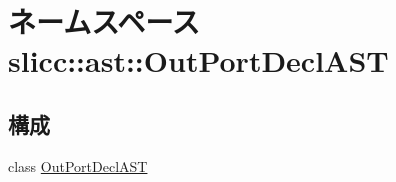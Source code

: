 \hypertarget{namespaceslicc_1_1ast_1_1OutPortDeclAST}{
\section{ネームスペース slicc::ast::OutPortDeclAST}
\label{namespaceslicc_1_1ast_1_1OutPortDeclAST}
}
\subsection*{構成}
\begin{DoxyCompactItemize}
\item 
class \hyperlink{classslicc_1_1ast_1_1OutPortDeclAST_1_1OutPortDeclAST}{OutPortDeclAST}
\end{DoxyCompactItemize}
